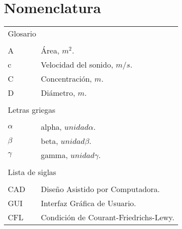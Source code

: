 \chapter*{Nomenclatura} %
\linespread{1.3}

\begin{longtable}{p{5mm} c p{120mm} }
	\multicolumn{3}{l}{Glosario}\\
	\\
	A & \qquad\qquad & Área, $m^{2}$.\\
	c & \qquad\qquad & Velocidad del sonido, $m/s$.\\
	C & \qquad\qquad & Concentración, $m$.\\
	D & \qquad\qquad & Diámetro, $m$.\\
	
	\\
	\multicolumn{3}{l}{Letras griegas}\\
	\\
	$\alpha$ & \qquad\qquad & alpha, $unidad \alpha$. \\	%
	$\beta$ & \qquad\qquad & beta, $unidad \beta$.\\	%
	$\gamma$ & \qquad\qquad & gamma, $unidad \gamma$.\\	%

	
	\\
		\multicolumn{3}{l}{Lista de siglas}\\
	\\
	CAD & \qquad\qquad  & Diseño Asistido por Computadora.\\ %
	GUI	& \qquad\qquad	& Interfaz Gráfica de Usuario.\\
	CFL	& \qquad\qquad	& Condición de Courant-Friedrichs-Lewy.\\
	
\end{longtable}
\clearpage